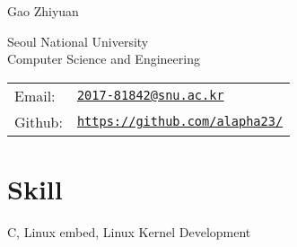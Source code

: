 \documentclass[letterpaper]{article}
\def\name{Gao Zhiyuan}
\renewenvironment{itemize}{
  \begin{list}{}{
    \setlength{\leftmargin}{1.5em}
  }
}{
  \end{list}
}
\begin{document}
{\huge \name}


\vspace{0.25in}

\begin{minipage}{0.45\linewidth}
  Seoul National University \\
  Computer Science and Engineering \\
\end{minipage}
\begin{minipage}{0.45\linewidth}
  \begin{tabular}{ll}
    Email: & \href{mailto:2017-81842@snu.ac.kr}{\tt 2017-81842@snu.ac.kr} \\
    Github: & \href{https://github.com/alapha23/}{\tt https://github.com/alapha23/} \\
  \end{tabular}
\end{minipage}


%

\section*{Skill}

\begin{itemize}
	\item C, Linux embed, Linux Kernel Development
\end{itemize}
\end{document}
